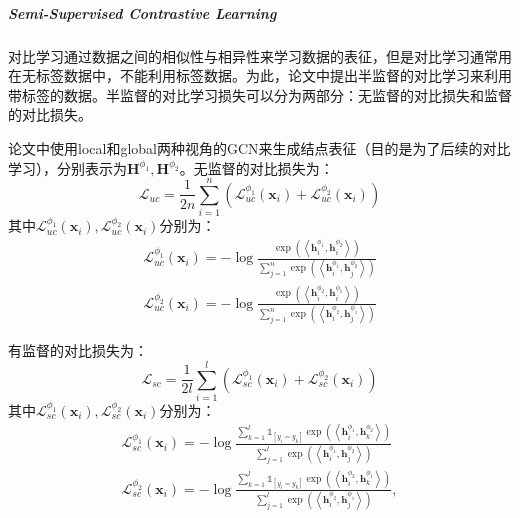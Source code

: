 \subparagraph{Semi-Supervised Contrastive Learning}
对比学习通过数据之间的相似性与相异性来学习数据的表征，但是对比学习通常用在无标签数据中，不能利用标签数据。为此，论文中提出半监督的对比学习来利用带标签的数据。半监督的对比学习损失可以分为两部分：无监督的对比损失和监督的对比损失。

论文中使用local和global两种视角的GCN来生成结点表征（目的是为了后续的对比学习），分别表示为$\mathbf{H}^{\phi_1}, \mathbf{H}^{\phi_2}$。无监督的对比损失为：
$$
\mathcal{L}_{u c}=\frac{1}{2 n} \sum_{i=1}^{n}\left(\mathcal{L}_{u c}^{\phi_{1}}\left(\mathbf{x}_{i}\right)+\mathcal{L}_{u c}^{\phi_{2}}\left(\mathbf{x}_{i}\right)\right)
$$
其中$\mathcal{L}_{u c}^{\phi_{1}}\left(\mathbf{x}_{i}\right), \mathcal{L}_{u c}^{\phi_{2}}\left(\mathbf{x}_{i}\right)$分别为：
$$
\begin{array}{l}
\mathcal{L}_{u c}^{\phi_{1}}\left(\mathbf{x}_{i}\right)=-\log \frac{\exp \left(\left\langle\mathbf{h}_{i}^{\phi_{1}}, \mathbf{h}_{i}^{\phi_{2}}\right\rangle\right)}{\sum_{j=1}^{n} \exp \left(\left\langle\mathbf{h}_{i}^{\phi_{1}}, \mathbf{h}_{j}^{\phi_{2}}\right\rangle\right)}\\

\mathcal{L}_{u c}^{\phi_{2}}\left(\mathbf{x}_{i}\right)=-\log \frac{\exp \left(\left\langle\mathbf{h}_{i}^{\phi_{2}}, \mathbf{h}_{i}^{\phi_{1}}\right\rangle\right)}{\sum_{j=1}^{n} \exp \left(\left\langle\mathbf{h}_{i}^{\phi_{2}}, \mathbf{h}_{j}^{\phi_{1}}\right\rangle\right)}
\end{array}
$$

有监督的对比损失为：
$$
\mathcal{L}_{s c}=\frac{1}{2 l} \sum_{i=1}^{l}\left(\mathcal{L}_{s c}^{\phi_{1}}\left(\mathbf{x}_{i}\right)+\mathcal{L}_{s c}^{\phi_{2}}\left(\mathbf{x}_{i}\right)\right)
$$
其中$\mathcal{L}_{s c}^{\phi_{1}}\left(\mathbf{x}_{i}\right), \mathcal{L}_{s c}^{\phi_{2}}\left(\mathbf{x}_{i}\right)$分别为：
$$
\begin{array}{l}
	\mathcal{L}_{s c}^{\phi_{1}}\left(\mathbf{x}_{i}\right)=-\log \frac{\sum_{k=1}^{l} \mathbb{1}_{\left[y_{i}=y_{k}\right]} \exp \left(\left\langle\mathbf{h}_{i}^{\phi_{1}}, \mathbf{h}_{k}^{\phi_{2}}\right\rangle\right)}{\sum_{j=1}^{l} \exp \left(\left\langle\mathbf{h}_{i}^{\phi_{1}}, \mathbf{h}_{j}^{\phi_{2}}\right\rangle\right)} \\
	\mathcal{L}_{s c}^{\phi_{2}}\left(\mathbf{x}_{i}\right)=-\log \frac{\sum_{k=1}^{l} \mathbb{1}_{\left[y_{i}=y_{k}\right]} \exp \left(\left\langle\mathbf{h}_{i}^{\phi_{2}}, \mathbf{h}_{k}^{\phi_{1}}\right\rangle\right)}{\sum_{j=1}^{l} \exp \left(\left\langle\mathbf{h}_{i}^{\phi_{2}}, \mathbf{h}_{j}^{\phi_{1}}\right\rangle\right)},
\end{array}
$$

